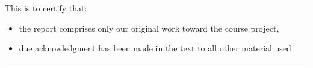 \thispagestyle{plain}

This is to certify that:
\begin{itemize}
\item[(i)] the report comprises only our original work toward the course project,
\item[(ii)] due acknowledgment has been made in the text to all other material used
\end{itemize}

\vspace{2cm}
\begin{flushright}
\rule[0mm]{6cm}{0.2mm}\\
\TeamNumber\\
\submissionDay\ \submissionMonth\ \submissionYear\\
\end{flushright}
\clearpage